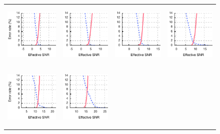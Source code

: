 \begin{figure}[p]
\begin{xtrafullpage}
\begin{tabular}{cccc}
	\midrule
	\includegraphics[height=1.2in]{figures/delivery_figures/goodbad/esnr_goodbad_16.pdf} &
	\includegraphics[height=1.2in]{figures/delivery_figures/goodbad/esnr_goodbad_17.pdf} &
	\includegraphics[height=1.2in]{figures/delivery_figures/goodbad/esnr_goodbad_18.pdf} &
	\includegraphics[height=1.2in]{figures/delivery_figures/goodbad/esnr_goodbad_19.pdf} \\
	\includegraphics[height=1.2in]{figures/delivery_figures/goodbad/esnr_goodbad_20.pdf} &
	\includegraphics[height=1.2in]{figures/delivery_figures/goodbad/esnr_goodbad_21.pdf} &

\end{tabular}
\end{xtrafullpage}
\end{figure}
